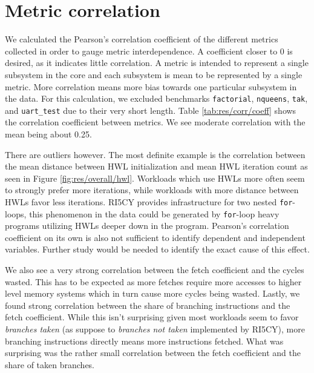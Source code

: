 \documentclass[../bachelor_paper.tex]{subfiles}
\begin{document}
\section{Metric correlation}
    \label{sec:res/corr}
We calculated the Pearson's correlation coefficient of the different metrics collected in order to gauge metric interdependence. A coefficient closer to 0 is desired, as it indicates little correlation. A metric is intended to represent a single subsystem in the core and each subsystem is mean to be represented by a single metric. More correlation means more bias towards one particular subsystem in the data. For this calculation, we excluded benchmarks \texttt{factorial}, \texttt{nqueens}, \texttt{tak}, and \texttt{uart\_test} due to their very short length. Table \ref{tab:res/corr/coeff} shows the correlation coefficient between metrics. We see moderate correlation with the mean being about 0.25. 

There are outliers however. The most definite example is the correlation between the mean distance between \ac{HWL} initialization and mean \ac{HWL} iteration count as seen in Figure \ref{fig:res/overall/hwl}. Workloads which use \acp{HWL} more often seem to strongly prefer more iterations, while workloads with more distance between \acp{HWL} favor less iterations. RI5CY provides infrastructure for two nested \texttt{for}-loops, this phenomenon in the data could be generated by \texttt{for}-loop heavy programs utilizing \acp{HWL} deeper down in the program. Pearson's correlation coefficient on its own is also not sufficient to identify dependent and independent variables. Further study would be needed to identify the exact cause of this effect. 

We also see a very strong correlation between the fetch coefficient and the cycles wasted. This has to be expected as more fetches require more accesses to higher level memory systems which in turn cause more cycles being wasted. Lastly, we found strong correlation between the share of branching instructions and the fetch coefficient. While this isn't surprising given most workloads seem to favor \emph{branches taken} (as suppose to \emph{branches not taken} implemented by RI5CY), more branching instructions directly means more instructions fetched. What was surprising was the rather small correlation between the fetch coefficient and the share of taken branches.
\end{document}
